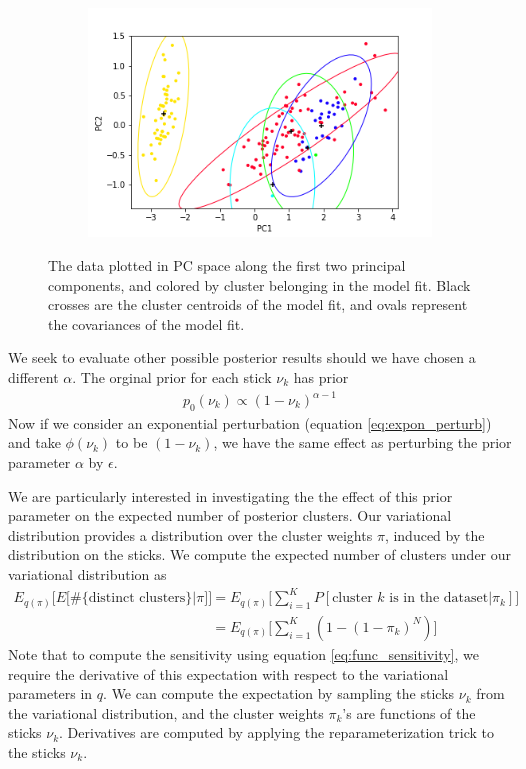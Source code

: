 \documentclass[a4paper]{article}
\begin{document}
\begin{figure}[h!]
	\centering
	\begin{subfigure}[t]{0.4\textwidth}
		\includegraphics[width = \textwidth]{./parametric_sens_results/init_fit_alpha8.png}
	\end{subfigure}
	\caption{The data plotted in PC space along the first two principal components, and colored by
	cluster belonging in the model fit. Black crosses are the cluster centroids of the model fit,
  and ovals represent the
  covariances of the model fit. }
	\label{fig:init_fit}
\end{figure}

We seek to evaluate other possible posterior results should we have chosen a different
$\alpha$. The orginal prior for each stick $\nu_k$ has prior
\begin{align}
  p_0(\nu_k) \propto (1 - \nu_k)^{\alpha - 1}
\end{align}
Now if we consider an exponential perturbation (equation \ref{eq:expon_perturb}) and
take $\phi(\nu_k)$ to be $(1 - \nu_k)$,
we have the same effect as perturbing the prior parameter $\alpha$  by $\epsilon$.

We are particularly interested in investigating the the effect of this prior
parameter on the expected number of posterior clusters. Our variational
distribution provides a distribution over the cluster weights $\pi$, induced
by the distribution on the sticks. We compute the expected number of
clusters under our variational distribution as
\begin{align}
  E_{q(\pi)}\Big[E\Big[\#\{\text{distinct clusters}\}|\pi\Big]\Big] &=
  E_{q(\pi)}\Big[\sum_{i=1}^K P[\text{cluster $k$ is in the dataset}|\pi_k]\Big] \\
    &= E_{q(\pi)} \Big[\sum_{i=1}^K (1 - (1 - \pi_k)^N)\Big]
    \label{eq:expected_num_clusters}
\end{align}
Note that to compute the sensitivity using equation \ref{eq:func_sensitivity},
we require the derivative
of this expectation with respect to the variational parameters in $q$. We can compute
the expectation by sampling the sticks $\nu_k$ from the variational distribution, and
the cluster weights $\pi_k$'s are functions of the sticks $\nu_k$. Derivatives
are computed by applying the reparameterization trick to the sticks $\nu_k$.
\end{document}
